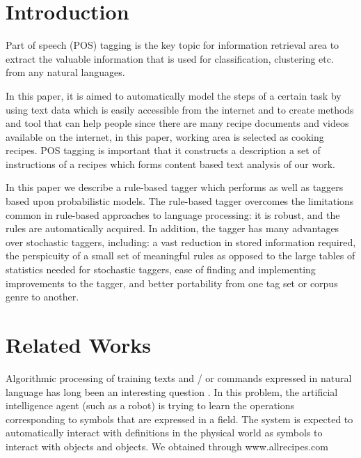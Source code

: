 
\section{Introduction}
Part of speech (POS) tagging is the key topic for information retrieval area to extract the valuable information that is used for classification, clustering etc. from any natural languages. 


In this paper, it is aimed to automatically model the steps of a certain task by using text data which is easily accessible from the internet and to create methods and tool that can help people since there are many recipe documents and videos available on the internet,  in this paper, working area is selected as cooking recipes. POS tagging is important that  it constructs a description a set of instructions of a recipes which forms content based text analysis of our work.

In this paper we describe a rule-based tagger which
performs as well as taggers based upon probabilistic
models. The rule-based tagger overcomes the limitations
common in rule-based approaches to language processing:
it is robust, and the rules are automatically acquired.
In addition, the tagger has many advantages
over stochastic taggers, including: a vast reduction in
stored information required, the perspicuity of a small
set of meaningful rules as opposed to the large tables
of statistics needed for stochastic taggers, ease of finding
and implementing improvements to the tagger, and
better portability from one tag set or corpus genre to
another. 

\section{Related Works}
Algorithmic processing of training texts and / or commands expressed in natural language has long been an interesting question \cite{harnad90} . In this problem, the artificial intelligence agent (such as a robot) is trying to learn the operations corresponding to symbols that are expressed in a field. The system is expected to automatically interact with definitions in the physical world as symbols to interact with objects and objects. We obtained through www.allrecipes.com

